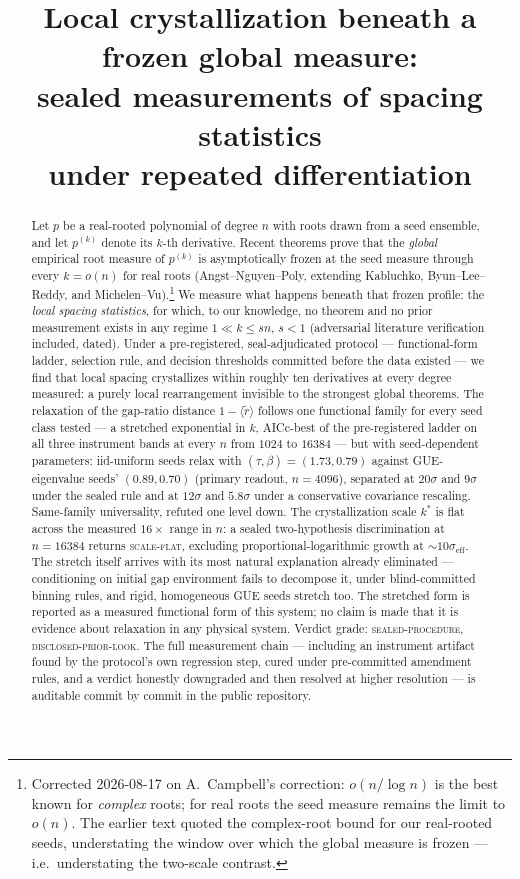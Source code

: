 \documentclass[11pt]{article}
\title{Local crystallization beneath a frozen global measure:\\
sealed measurements of spacing statistics\\ under repeated differentiation}
\author{}
\date{}
\newcommand{\rt}{\widetilde{r}}
\newcommand{\gapdist}{1-\langle\rt\rangle}
\newcommand{\kstar}{k^{*}}
\newcommand{\seff}{\sigma_{\mathrm{eff}}}
\newcommand{\verdict}[1]{\textsc{#1}}
\begin{document}
\maketitle

\begin{abstract}
Let $p$ be a real-rooted polynomial of degree $n$ with roots drawn from a seed ensemble, and
let $p^{(k)}$ denote its $k$-th derivative. Recent theorems prove that the \emph{global}
empirical root measure of $p^{(k)}$ is asymptotically frozen at the seed measure through every
$k=o(n)$ for real roots (Angst--Nguyen--Poly, extending Kabluchko, Byun--Lee--Reddy, and
Michelen--Vu).\footnote{Corrected 2026-08-17 on A.\ Campbell's correction: $o(n/\log n)$ is the
best known for \emph{complex} roots; for real roots the seed measure remains the limit to
$o(n)$. The earlier text quoted the complex-root bound for our real-rooted seeds, understating
the window over which the global measure is frozen --- i.e.\ understating the two-scale
contrast.} We measure what happens beneath that frozen profile: the \emph{local spacing
statistics}, for which, to our knowledge, no theorem and no prior measurement exists in any
regime $1\ll k\le sn$, $s<1$ (adversarial literature verification included, dated). Under a
pre-registered, seal-adjudicated protocol --- functional-form ladder, selection rule, and
decision thresholds committed before the data existed --- we find that local spacing
crystallizes within roughly ten derivatives at every degree measured: a purely local
rearrangement invisible to the strongest global theorems. The relaxation of the gap-ratio
distance $\gapdist$ follows one functional family for every seed class tested --- a stretched
exponential in $k$, AICc-best of the pre-registered ladder on all three instrument bands at
every $n$ from $1024$ to $16384$ --- but with seed-dependent parameters: iid-uniform seeds
relax with $(\tau,\beta)=(1.73,0.79)$ against GUE-eigenvalue seeds' $(0.89,0.70)$ (primary
readout, $n=4096$), separated at $20\sigma$ and $9\sigma$ under the sealed rule and at
$12\sigma$ and $5.8\sigma$ under a conservative covariance rescaling. Same-family
universality, refuted one level down. The crystallization scale $\kstar$ is flat across the
measured $16\times$ range in $n$: a sealed two-hypothesis discrimination at $n=16384$ returns
\verdict{scale-flat}, excluding proportional-logarithmic growth at ${\sim}10\seff$. The
stretch itself arrives with its most natural explanation already eliminated --- conditioning
on initial gap environment fails to decompose it, under blind-committed binning rules, and
rigid, homogeneous GUE seeds stretch too. The stretched form is
reported as a measured functional form of this system; no claim is made that it is evidence
about relaxation in any physical system. Verdict grade: \verdict{sealed-procedure, disclosed-prior-look}. The full
measurement chain --- including an instrument artifact found by the protocol's own regression
step, cured under pre-committed amendment rules, and a verdict honestly downgraded and then
resolved at higher resolution --- is auditable commit by commit in the public repository.
\end{abstract}
\end{document}
